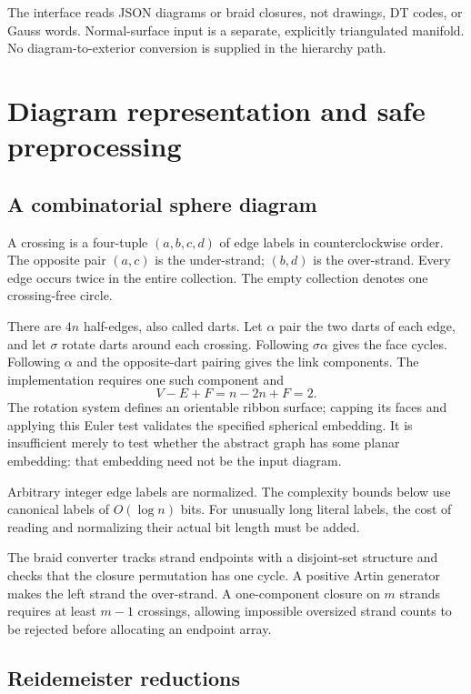\documentclass[11pt]{article}
\theoremstyle{definition}
\begin{document}
The interface reads JSON diagrams or braid closures, not drawings, DT codes,
or Gauss words. Normal-surface input is a separate, explicitly triangulated
manifold. No diagram-to-exterior conversion is supplied in the hierarchy path.

\section{Diagram representation and safe preprocessing}

\subsection{A combinatorial sphere diagram}

A crossing is a four-tuple $(a,b,c,d)$ of edge labels in counterclockwise order.
The opposite pair $(a,c)$ is the under-strand; $(b,d)$ is the over-strand. Every
edge occurs twice in the entire collection. The empty collection denotes one
crossing-free circle.

There are $4n$ half-edges, also called darts. Let $\alpha$ pair the two darts of
each edge, and let $\sigma$ rotate darts around each crossing. Following
$\sigma\alpha$ gives the face cycles. Following $\alpha$ and the opposite-dart
pairing gives the link components. The implementation requires one such
component and
\[
 V-E+F=n-2n+F=2.
\]
The rotation system defines an orientable ribbon surface; capping its faces
and applying this Euler test validates the specified spherical embedding. It
is insufficient merely to test whether the abstract graph has some planar
embedding: that embedding need not be the input diagram.

Arbitrary integer edge labels are normalized. The complexity bounds below use
canonical labels of $O(\log n)$ bits. For unusually long literal labels, the
cost of reading and normalizing their actual bit length must be added.

The braid converter tracks strand endpoints with a disjoint-set structure and
checks that the closure permutation has one cycle. A positive Artin generator
makes the left strand the over-strand. A one-component closure on $m$ strands
requires at least $m-1$ crossings, allowing impossible oversized strand counts
to be rejected before allocating an endpoint array.

\subsection{Reidemeister reductions}
\end{document}
